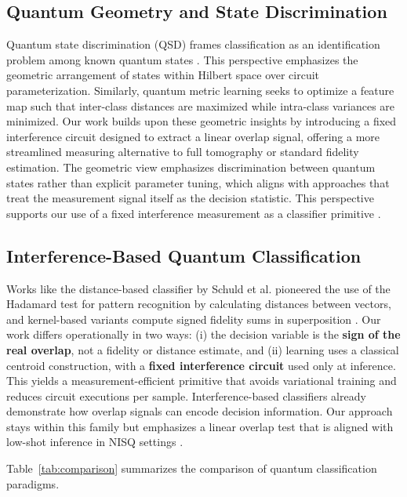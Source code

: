 \documentclass[conference]{IEEEtran}
\begin{document}
\subsection{Quantum Geometry and State Discrimination}
Quantum state discrimination (QSD) frames classification as an identification problem among known quantum states \cite{sergioli2019binary,gonzalez2021classification}. This perspective emphasizes the geometric arrangement of states within Hilbert space over circuit parameterization. Similarly, quantum metric learning seeks to optimize a feature map such that inter-class distances are maximized while intra-class variances are minimized. Our work builds upon these geometric insights by introducing a fixed interference circuit designed to extract a linear overlap signal, offering a more streamlined measuring alternative to full tomography or standard fidelity estimation.
The geometric view emphasizes discrimination between quantum states rather than explicit parameter tuning, which aligns with approaches that treat the measurement signal itself as the decision statistic. This perspective supports our use of a fixed interference measurement as a classifier primitive \cite{sergioli2019binary,gonzalez2021classification}.

\subsection{Interference-Based Quantum Classification}

Works like the distance-based classifier by Schuld et al. \cite{schuld2017distance,schuld2018book} pioneered the use of the Hadamard test for pattern recognition by calculating distances between vectors, and kernel-based variants compute signed fidelity sums in superposition \cite{blank2020kernel,blank2022compact}. Our work differs operationally in two ways: (i) the decision variable is the \textbf{sign of the real overlap}, not a fidelity or distance estimate, and (ii) learning uses a classical centroid construction, with a \textbf{fixed interference circuit} used only at inference. This yields a measurement-efficient primitive that avoids variational training and reduces circuit executions per sample.
Interference-based classifiers already demonstrate how overlap signals can encode decision information. Our approach stays within this family but emphasizes a linear overlap test that is aligned with low-shot inference in NISQ settings \cite{schuld2017distance,schuld2018book}.

Table~\ref{tab:comparison} summarizes the comparison of quantum classification paradigms.
\end{document}
